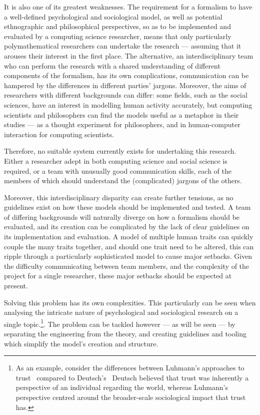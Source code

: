 It is also one of its greatest weaknesses. The requirement for a formalism to have a well-defined psychological and sociological model, as well as potential ethnographic and philosophical perspectives, so as to be implemented and evaluated by a computing science researcher, means that only particularly polymathematical researchers can undertake the research --- assuming that it arouses their interest in the first place. The alternative, an interdisciplinary team who can perform the research with a shared understanding of different components of the formalism, has its own complications, communication can be hampered by the differences in different parties' jargons. Moreover, the aims of researchers with different backgrounds can differ: some fields, such as the social sciences, have an interest in modelling human activity accurately, but computing scientists and philosophers can find the models useful as a metaphor in their studies --- as a thought experiment for philosophers, and in human-computer interaction for computing scientists.\par

Therefore, no suitable system currently exists for undertaking this research. Either a researcher adept in both computing science and social science is required, or a team with unusually good communication skills, each of the members of which should understand the (complicated) jargons of the others.\par

Moreover, this interdisciplinary disparity can create further tensions, as no guidelines exist on how these models should be implemented and tested. A team of differing backgrounds will naturally diverge on how a formalism should be evaluated, and its creation can be complicated by the lack of clear guidelines on its implementation and evaluation. A model of multiple human traits can quickly couple the many traits together, and should one trait need to be altered, this can ripple through a particularly sophisticated model to cause major setbacks. Given the difficulty communicating between team members, and the complexity of the project for a single researcher, these major setbacks should be expected at present.\par

Solving this problem has its own complexities. This particularly can be seen when analysing the intricate nature of psychological and sociological research on a single topic.\footnote{As an example, consider the differences between Luhmann's approaches to trust~\cite{luhmann2000familiarity} compared to Deutsch's~\cite{deutsch1962cooperation} Deutsch believed that trust was inherently a perspective of an individual regarding the world, whereas Luhmann's perspective centred around the broader-scale sociological impact that trust has.}. The problem can be tackled however --- as will be seen --- by separating the engineering from the theory, and creating guidelines and tooling which simplify the model's creation and structure.\par

